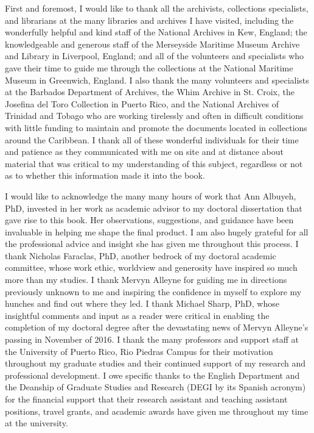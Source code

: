 \addchap{\lsAcknowledgementTitle}
First and foremost, I would like to thank all the archivists, collections specialists, and librarians at the many libraries and archives I have visited, including the wonderfully helpful and kind staff of the National Archives in Kew, England; the knowledgeable and generous staff of the Merseyside Maritime Museum Archive and Library in Liverpool, England; and all of the volunteers and specialists who gave their time to guide me through the collections at the National Maritime Museum in Greenwich, England. I also thank the many volunteers and specialists at the Barbados Department of Archives, the Whim Archive in St. Croix, the Josefina del Toro Collection in Puerto Rico, and the National Archives of Trinidad and Tobago who are working tirelessly and often in difficult conditions with little funding to maintain and promote the documents located in collections around the Caribbean. I thank all of these wonderful individuals for their time and patience as they communicated with me on site and at distance about material that was critical to my understanding of this subject, regardless or not as to whether this information made it into the book. 

I would like to acknowledge the many many hours of work that Ann Albuyeh, PhD, invested in her work as academic advisor to my doctoral dissertation that gave rise to this book. Her observations, suggestions, and guidance have been invaluable in helping me shape the final product. I am also hugely grateful for all the professional advice and insight she has given me throughout this process. I thank Nicholas Faraclas, PhD, another bedrock of my doctoral academic committee, whose work ethic, worldview and generosity have inspired so much more than my studies. I thank Mervyn Alleyne for guiding me in directions previously unknown to me and inspiring the confidence in myself to explore my hunches and find out where they led. I thank Michael Sharp, PhD, whose insightful comments and input as a reader were critical in enabling the completion of my doctoral degree after the devastating news of Mervyn Alleyne’s passing in November of 2016. I thank the many professors and support staff at the University of Puerto Rico, Rio Piedras Campus for their motivation throughout my graduate studies and their continued support of my research and professional development. I owe specific thanks to the English Department and the Deanship of Graduate Studies and Research (DEGI by its Spanish acronym) for the financial support that their research assistant and teaching assistant positions, travel grants, and academic awards have given me throughout my time at the university.

